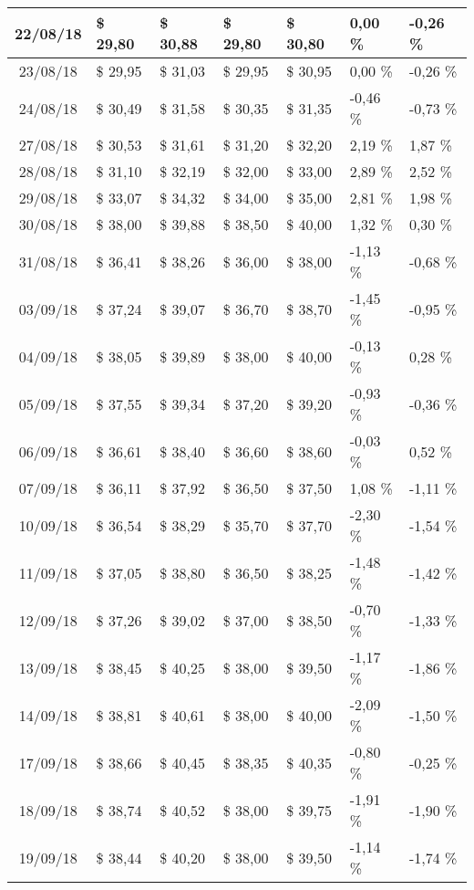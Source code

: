 \begin{center}
\begin{longtable}{|c|p{1.5cm}|p{1.5cm}|p{1.5cm}|p{1.5cm}|p{1.5cm}|p{1.5cm}|}
22/08/18 & \$ 29,80 & \$ 30,88 & \$ 29,80 & \$ 30,80 & 0,00 \% & -0,26 \% \\ \hline
23/08/18 & \$ 29,95 & \$ 31,03 & \$ 29,95 & \$ 30,95 & 0,00 \% & -0,26 \% \\ \hline
24/08/18 & \$ 30,49 & \$ 31,58 & \$ 30,35 & \$ 31,35 & -0,46 \% & -0,73 \% \\ \hline
27/08/18 & \$ 30,53 & \$ 31,61 & \$ 31,20 & \$ 32,20 & 2,19 \% & 1,87 \% \\ \hline
28/08/18 & \$ 31,10 & \$ 32,19 & \$ 32,00 & \$ 33,00 & 2,89 \% & 2,52 \% \\ \hline
29/08/18 & \$ 33,07 & \$ 34,32 & \$ 34,00 & \$ 35,00 & 2,81 \% & 1,98 \% \\ \hline
30/08/18 & \$ 38,00 & \$ 39,88 & \$ 38,50 & \$ 40,00 & 1,32 \% & 0,30 \% \\ \hline
31/08/18 & \$ 36,41 & \$ 38,26 & \$ 36,00 & \$ 38,00 & -1,13 \% & -0,68 \% \\ \hline
03/09/18 & \$ 37,24 & \$ 39,07 & \$ 36,70 & \$ 38,70 & -1,45 \% & -0,95 \% \\ \hline
04/09/18 & \$ 38,05 & \$ 39,89 & \$ 38,00 & \$ 40,00 & -0,13 \% & 0,28 \% \\ \hline
05/09/18 & \$ 37,55 & \$ 39,34 & \$ 37,20 & \$ 39,20 & -0,93 \% & -0,36 \% \\ \hline
06/09/18 & \$ 36,61 & \$ 38,40 & \$ 36,60 & \$ 38,60 & -0,03 \% & 0,52 \% \\ \hline
07/09/18 & \$ 36,11 & \$ 37,92 & \$ 36,50 & \$ 37,50 & 1,08 \% & -1,11 \% \\ \hline
10/09/18 & \$ 36,54 & \$ 38,29 & \$ 35,70 & \$ 37,70 & -2,30 \% & -1,54 \% \\ \hline
11/09/18 & \$ 37,05 & \$ 38,80 & \$ 36,50 & \$ 38,25 & -1,48 \% & -1,42 \% \\ \hline
12/09/18 & \$ 37,26 & \$ 39,02 & \$ 37,00 & \$ 38,50 & -0,70 \% & -1,33 \% \\ \hline
13/09/18 & \$ 38,45 & \$ 40,25 & \$ 38,00 & \$ 39,50 & -1,17 \% & -1,86 \% \\ \hline
14/09/18 & \$ 38,81 & \$ 40,61 & \$ 38,00 & \$ 40,00 & -2,09 \% & -1,50 \% \\ \hline
17/09/18 & \$ 38,66 & \$ 40,45 & \$ 38,35 & \$ 40,35 & -0,80 \% & -0,25 \% \\ \hline
18/09/18 & \$ 38,74 & \$ 40,52 & \$ 38,00 & \$ 39,75 & -1,91 \% & -1,90 \% \\ \hline
19/09/18 & \$ 38,44 & \$ 40,20 & \$ 38,00 & \$ 39,50 & -1,14 \% & -1,74 \% \\ \hline

\end{longtable}
\end{center}
